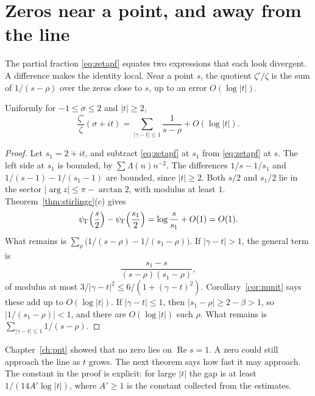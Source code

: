 \section{Zeros near a point, and away from the line}

The partial fraction \eqref{eq:zetapf} equates two expressions that each look divergent. A difference makes the identity local. Near a point $s$, the quotient $\zeta'/\zeta$ is the sum of $1/(s-\rho)$ over the zeros close to $s$, up to an error $O(\log|t|)$.

\begin{proposition}\label{prop:nearzeros}
Uniformly for $-1\le\sigma\le2$ and $|t|\ge2$,
\[
\frac{\zeta'}{\zeta}(\sigma+it)=\sum_{|\gamma-t|\le1}\frac1{s-\rho}+O(\log|t|).
\]
\end{proposition}
\begin{proof}
Let $s_1=2+it$, and subtract \eqref{eq:zetapf} at $s_1$ from \eqref{eq:zetapf} at $s$. The left side at $s_1$ is bounded, by $\sum\Lambda(n)n^{-2}$. The differences $1/s-1/s_1$ and $1/(s-1)-1/(s_1-1)$ are bounded, since $|t|\ge2$. Both $s/2$ and $s_1/2$ lie in the sector $|\arg z|\le\pi-\arctan2$, with modulus at least $1$. Theorem~\ref{thm:stirlingc}(c) gives
\[
\psi_\Gamma\Bigl(\frac s2\Bigr)-\psi_\Gamma\Bigl(\frac{s_1}2\Bigr)=\log\frac s{s_1}+O(1)=O(1).
\]
What remains is $\sum_\rho\bigl(1/(s-\rho)-1/(s_1-\rho)\bigr)$. If $|\gamma-t|>1$, the general term is
\[
\frac{s_1-s}{(s-\rho)(s_1-\rho)},
\]
of modulus at most $3/|\gamma-t|^2\le6/(1+(\gamma-t)^2)$. Corollary~\ref{cor:nunit} says these add up to $O(\log|t|)$. If $|\gamma-t|\le1$, then $|s_1-\rho|\ge2-\beta>1$, so $|1/(s_1-\rho)|<1$, and there are $O(\log|t|)$ such $\rho$. What remains is $\sum_{|\gamma-t|\le1}1/(s-\rho)$.
\end{proof}

Chapter~\ref{ch:pnt} showed that no zero lies on $\operatorname{Re}s=1$. A zero could still approach the line as $t$ grows. The next theorem says how fast it may approach. The constant in the proof is explicit: for large $|t|$ the gap is at least $1/(14A'\log|t|)$, where $A'\ge1$ is the constant collected from the estimates.

